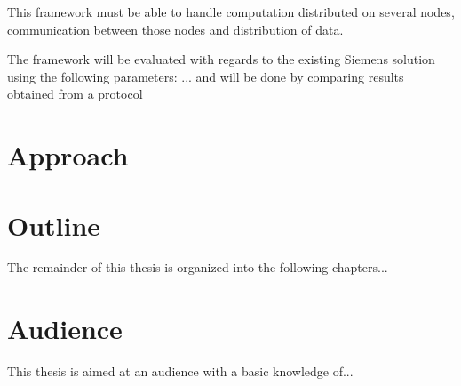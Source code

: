 This framework must be able to handle computation distributed on several nodes, communication between those nodes and distribution of data. 

The framework will be evaluated with regards to the existing Siemens solution using the following parameters: ... and will be done by comparing results obtained from a protocol 


%
%
%

\section{Approach}

\section{Outline}
The remainder of this thesis is organized into the following chapters...

\section{Audience}
This thesis is aimed at an audience with a basic knowledge of...
